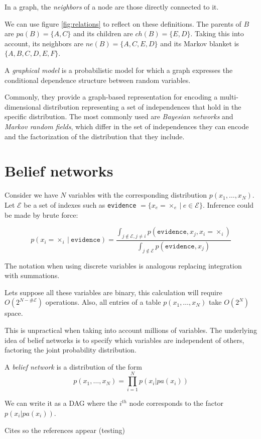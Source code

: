 \documentclass[oneside,openright,titlepage,numbers=noenddot,openany,headinclude,footinclude=true,
  cleardoublepage=empty,abstractoff,BCOR=5mm,paper=a4,fontsize=12pt]{scrreprt}
\begin{document}
\begin{definition}
In a graph, the \emph{neighbors} of a node are those directly connected
to it.
\end{definition}

We can use figure \ref{fig:relations} to reflect on these definitions. The parents
of \(B\) are \(pa(B) = \{A,C\}\) and its children are \(ch(B) = \{E,D\}\). Taking this into account, its neighbors
are \(ne(B) = \{A,C,E,D\}\) and its Markov blanket is \(\{A,B,C,D,E,F\}\).

\begin{definition}
A \emph{graphical model} is a probabilistic model for which a graph expresses the
conditional dependence structure between random variables.
\end{definition}

Commonly, they provide a graph-based representation for encoding a multi-dimensional
distribution representing a set of independences that hold in the specific
distribution. The most commonly used are \emph{Bayesian networks} and \emph{Markov random
fields}, which differ in the set of independences they can encode and the
factorization of the distribution that they include.

\section{Belief networks}

Consider we have \(N\) variables with the corresponding distribution
\(p(x_1,\dots,x_N)\). Let \(\mathcal{E}\) be a set of indexes such as \texttt{evidence}
\(=\{x_e = \times _e \ | \ e \in \mathcal{E}\}\). Inference could be made by brute
force:

\[
p(x_i = \times _i \ | \ \texttt{evidence}) = \frac{ \int_{ j \not \in
\mathcal{E}, j \neq i } p(\texttt{evidence}, x_j, x_i = \times_i)}{ \int_{ j
\not \in \mathcal{E} } p(\texttt{evidence}, x_j)}
\]

The notation when using discrete variables is analogous replacing integration
with summations.

Lets suppose all these variables are binary, this calculation will require
\(O(2^{N-\#\mathcal{E}})\) operations. Also, all entries of a table \(p(x_1,\dots,
x_N)\) take \(O(2^N)\) space.

This is unpractical when taking into account millions of variables. The
underlying idea of belief networks is to specify which variables are independent
of others, factoring the joint probability distribution.

\begin{definition}
A \emph{belief network} is a distribution of the form
\[
p(x_1,\dots,x_N) = \prod_{i=1}^{N}p(x_i | pa(x_i))
\]
\end{definition}

We can write it as a DAG where the \(i^{th}\) node corresponds to the factor
\(p(x_i|pa(x_i))\).


\clearpage
Cites so the references appear (testing) \cite{koller_friedman,barber,wainwright}


\end{document}
